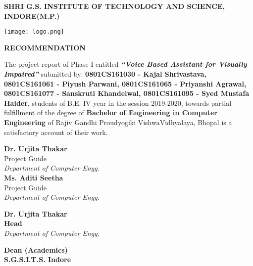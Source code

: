 \pagestyle{plain}
\large
\begin{center}
    


\textbf{SHRI G.S. INSTITUTE OF TECHNOLOGY AND SCIENCE, INDORE(M.P.)\\}

\vspace*{0.7cm}

\texttt{[image: logo.png]}

\vspace*{0.7cm}
\normalfont\LARGE\centering
\textbf{RECOMMENDATION} \\
\end{center}
\normalsize
The project report of Phase-I entitled \emph{\textbf{``Voice Based Assistant for Visually Impaired''}} submitted by:
\textbf{
0801CS161030 - Kajal Shrivastava,
0801CS161061 - Piyush Parwani, 
0801CS161065 - Priyanshi Agrawal, 
0801CS161077 - Sanskruti Khandelwal, 
0801CS161095 - Syed Mustafa Haider}, students of B.E. IV year in the session 2019-2020, towards partial fulfillment of the degree of \textbf{Bachelor of Engineering in Computer Engineering} of Rajiv Gandhi Proudyogiki VishwaVidhyalaya, Bhopal is a satisfactory account of their work.



\begin{minipage}[t]{0.45\textwidth}
    \flushleft
    \vspace*{2cm}
    \textbf{Dr. Urjita Thakar} \\
    Project Guide \\
    \emph{Department of Computer Engg.} \\
    \vspace*{2cm}
    \textbf{Ms. Aditi Seetha} \\
    Project Guide \\
    \emph{Department of Computer Engg.} \\
\end{minipage}
    \hfill
\begin{minipage}[t]{0.45\textwidth}
    \flushleft
    \vspace{2cm}
    \textbf{Dr. Urjita Thakar} \\
    \textbf{Head} \\
    \emph{Department of Computer Engg.} \\
    \vspace*{2.6cm}
    
    
    
\end{minipage}
    
    \vspace*{\fill}
    \begin{center}
    \textbf{Dean (Academics) \\
    S.G.S.I.T.S. Indore \\}    
    \end{center}
    


